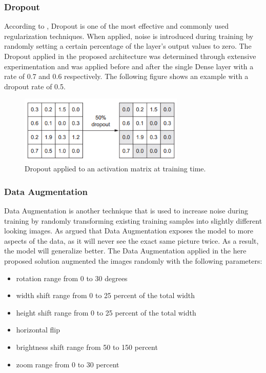 \subsubsection{Dropout}
According to \citet{Chollet:2017:DeepLearningPython}, Dropout is one of the most effective and commonly used regularization techniques. When applied, noise is introduced during training by randomly setting a certain percentage of the layer's output values to zero. The Dropout applied in the proposed architecture was determined through extensive experimentation and was applied before and after the single Dense layer with a rate of 0.7 and 0.6 respectively. The following figure shows an example with a dropout rate of 0.5.

\begin{figure}[H]
  \begin{center}
  \includegraphics[angle=0, width=0.7\textwidth]{Figures/dropout.PNG}
  \caption{Dropout applied to an activation matrix at training time.\citep{Chollet:2017:DeepLearningPython}}
  \label{fig:Dropout}
  \end{center}
\end{figure}

\subsubsection{Data Augmentation}
Data Augmentation is another technique that is used to increase noise during training by randomly transforming existing training samples into slightly different looking images. As \citet{Chollet:2017:DeepLearningPython} argued that Data Augmentation exposes the model to more aspects of the data, as it will never see the exact same picture twice. As a result, the model will generalize better.
The Data Augmentation applied in the here proposed solution augmented the images randomly with the following parameters:

\begin{itemize}
    \item rotation range from 0 to 30 degrees
    \item width shift range from 0 to 25 percent of the total width
    \item height shift range from 0 to 25 percent of the total width
    \item horizontal flip
    \item brightness shift range from 50 to 150 percent
    \item zoom range from 0 to 30 percent
\end{itemize}


